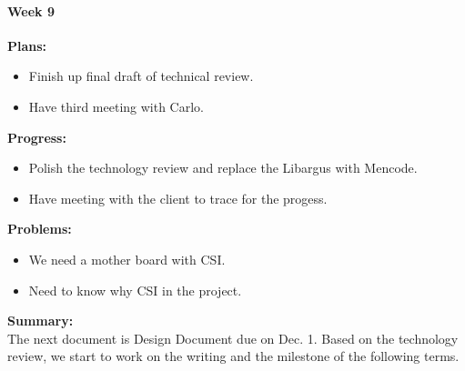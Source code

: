 \paragraph{Week 9}
\begin{adjustwidth}{2.5em}{0pt}
    \vspace{-0.5cm}\textbf{Plans:}
    \vspace{-0.5cm}
    \begin{itemize}
        \item Finish up final draft of technical review.
        \item Have third meeting with Carlo.
    \end{itemize} 
    \vspace{-0.3cm}\textbf{Progress:}
    \vspace{-0.5cm}
    \begin{itemize}
        \item Polish the technology review and replace the Libargus with Mencode.
        \item Have meeting with the client to trace for the progess.
    \end{itemize} 
    \vspace{-0.3cm}\textbf{Problems:}
    \vspace{-0.5cm}
    \begin{itemize}
        \item We need a mother board with CSI.
        \item Need to know why CSI in the project.
    \end{itemize}  
    \vspace{-0.3cm}\noindent\textbf{Summary:}\\
    \noindent The next document is Design Document due on Dec. 1. Based on the technology review, we 
    start to work on the writing and the milestone of the following terms. \\
\end{adjustwidth} 

